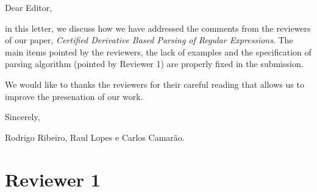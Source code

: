 \documentclass{article}
\date{Ouro Preto, \today}
\begin{document}
\noindent
Dear Editor,

\vspace{1cm}

in this letter, we discuss how we have addressed the comments from the reviewers
of our paper, \textit{Certified Derivative Based Parsing of Regular Expressions}. 
The main items pointed by the reviewers, the lack of examples and the specification 
of parsing algorithm (pointed by Reviewer 1) are properly fixed in the submission.

We would like to thanks the reviewers for their careful reading that allows us 
to improve the presenation of our work.

\vspace{1cm}

\noindent
Sincerely,


\vspace{1cm}

\noindent
Rodrigo Ribeiro, Raul Lopes e Carlos Camar\~ao.

\vspace{1cm}



\section*{Reviewer 1}
\end{document}
